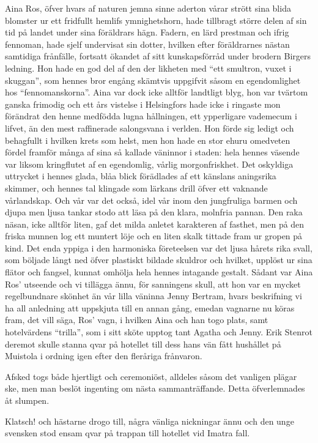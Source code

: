 Aina Ros, öfver hvars af naturen jemna sinne aderton vårar strött sina
blida blomster ur ett fridfullt hemlifs ymnighetshorn, hade tillbragt
större delen af sin tid på landet under sina föräldrars hägn. Fadern, en
lärd prestman och ifrig fennoman, hade sjelf undervisat sin dotter,
hvilken efter föräldrarnes nästan samtidiga frånfälle, fortsatt ökandet
af sitt kunskapsförråd under brodern Birgers ledning. Hon hade en god
del af den der likheten med ``ett smultron, vuxet i skuggan'', som
hennes bror engång skämtvis uppgifvit såsom en egendomlighet hos
``fennomanskorna''. Aina var dock icke alltför landtligt blyg, hon var
tvärtom ganska frimodig och ett års vistelse i Helsingfors hade icke i
ringaste mon förändrat den henne medfödda lugna hållningen, ett
ypperligare vademecum i lifvet, än den mest raffinerade salongsvana i
verlden. Hon förde sig ledigt och behagfullt i hvilken krets som helst,
men hon hade en stor ehuru omedveten fördel framför många af sina så
kallade väninnor i staden: hela hennes väsende var liksom kringflutet af
en egendomlig, vårlig morgonfriskhet. Det oskyldiga uttrycket i hennes
glada, blåa blick förädlades af ett känslans aningsrika skimmer, och
hennes tal klingade som lärkans drill öfver ett vaknande vårlandskap.
Och vår var det också, idel vår inom den jungfruliga barmen och djupa
men ljusa tankar stodo att läsa på den klara, molnfria pannan. Den raka
näsan, icke alltför liten, gaf det milda anletet karakteren af fasthet,
men på den friska munnen log ett muntert löje och en liten skalk tittade
fram ur gropen på kind. Det enda yppiga i den harmoniska företeelsen var
det ljusa hårets rika svall, som böljade långt ned öfver plastiskt
bildade skuldror och hvilket, upplöst ur sina flätor och fangsel, kunnat
omhölja hela hennes intagande gestalt. Sådant var Aina Ros' utseende och
vi tillägga ännu, för sanningens skull, att hon var en mycket
regelbundnare skönhet än vår lilla väninna Jenny Bertram, hvars
beskrifning vi ha all anledning att uppskjuta till en annan gång, emedan
vagnarne nu köras fram, det vill säga, Ros' vagn, i hvilken Aina och han
togo plats, samt hotelvärdens ``trilla'', som i sitt sköte upptog tant
Agatha och Jenny. Erik Stenrot deremot skulle stanna qvar på hotellet
till dess hans vän fått hushållet på Muistola i ordning igen efter den
fleråriga frånvaron.

Afsked togs både hjertligt och ceremoniöst, alldeles såsom det vanligen
plägar ske, men man beslöt ingenting om nästa sammanträffande. Detta
öfverlemnades åt slumpen.

Klatsch! och hästarne drogo till, några vänliga nickningar ännu och den
unge svensken stod ensam qvar på trappan till hotellet vid Imatra fall.

